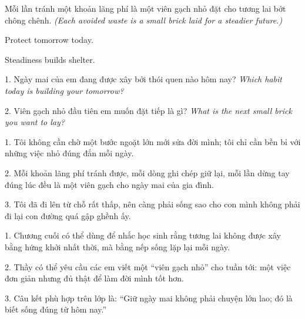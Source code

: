 \begin{baihoc}
Mỗi lần tránh một khoản lãng phí là một viên gạch nhỏ đặt cho tương lai bớt chông chênh.
\textit{(Each avoided waste is a small brick laid for a steadier future.)}
\end{baihoc}

\begin{ghinhoanh}
Protect tomorrow today.

Steadiness builds shelter.
\end{ghinhoanh}

\begin{tuhocnhanh}
1. Ngày mai của em đang được xây bởi thói quen nào hôm nay? \textit{Which habit today is building your tomorrow?}

2. Viên gạch nhỏ đầu tiên em muốn đặt tiếp là gì? \textit{What is the next small brick you want to lay?}
\end{tuhocnhanh}

\begin{turanminh}
1. Tôi không cần chờ một bước ngoặt lớn mới sửa đời mình; tôi chỉ cần bền bỉ với những việc nhỏ đúng đắn mỗi ngày.

2. Mỗi khoản lãng phí tránh được, mỗi dòng ghi chép giữ lại, mỗi lần dừng tay đúng lúc đều là một viên gạch cho ngày mai của gia đình.

3. Tôi đã đi lên từ chỗ rất thấp, nên càng phải sống sao cho con mình không phải đi lại con đường quá gập ghềnh ấy.
\end{turanminh}

\begin{dayhoc}
1. Chương cuối có thể dùng để nhắc học sinh rằng tương lai không được xây bằng hứng khởi nhất thời, mà bằng nếp sống lặp lại mỗi ngày.

2. Thầy có thể yêu cầu các em viết một ``viên gạch nhỏ'' cho tuần tới: một việc đơn giản nhưng đủ thật để làm đời mình tốt hơn.

3. Câu kết phù hợp trên lớp là: ``Giữ ngày mai không phải chuyện lớn lao; đó là biết sống đúng từ hôm nay.''
\end{dayhoc}